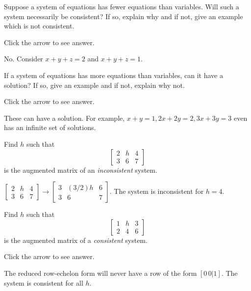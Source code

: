 \documentclass{ximera}
\begin{document}
\begin{problem}\label{prb:2.8}
Suppose a system of equations has fewer equations than variables. Will such a system necessarily be consistent? If so, explain why and if not, give an example which is not consistent.

Click the arrow to see answer.
\begin{expandable}
No. Consider $x+y+z=2$ and $x+y+z=1.$
\end{expandable}
\end{problem}

\begin{problem}\label{prb:2.9}
If a system of equations has more equations than variables, can it
have a solution? If so, give an example and if not, explain why not.

Click the arrow to see answer. 
\begin{expandable}
These can
have a solution. For example, $x+y=1,2x+2y=2,3x+3y=3$ even has an infinite
set of solutions.
\end{expandable}
\end{problem}

\begin{problem}\label{prb:2.10}
Find $h$ such that
\begin{equation*}
\left[
\begin{array}{rr|r}
2 & h & 4 \\
3 & 6 & 7
\end{array}
\right]
\end{equation*}
is the augmented matrix of an \textit{inconsistent} system.

\begin{expandable}
 $\left[
\begin{array}{cc|c}
2 & h & 4 \\
3 & 6 & 7
\end{array}
\right]\rightarrow \left[
\begin{array}{cc|c}
3 & (3/2)h & 6 \\
3 & 6 & 7
\end{array}
\right]$.  The system is inconsistent for $h=4$.
\end{expandable}

\end{problem}

\begin{problem}\label{prb:2.11}
Find $h$ such that
\begin{equation*}
\left[
\begin{array}{rr|r}
1 & h & 3 \\
2 & 4 & 6
\end{array}
\right]
\end{equation*}
is the augmented matrix of a \textit{consistent} system.

Click the arrow to see answer. 
\begin{expandable}
 The reduced row-echelon form will never have a row of the form $[0\, 0|1]$. The system is consistent for all $h$.
\end{expandable}
\end{problem}
\end{document}
